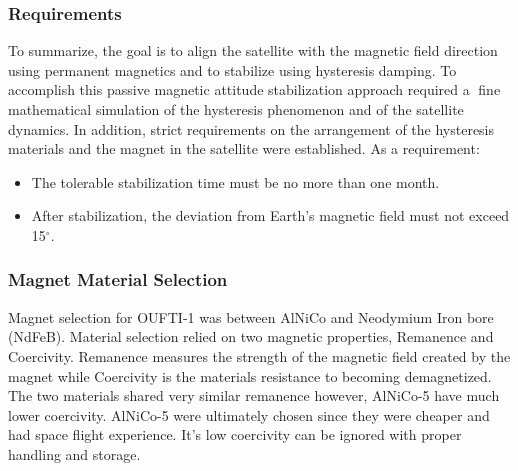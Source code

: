 \documentclass[12pt]{article}
\begin{document}
\subsubsection{Requirements}
To summarize, the goal is to align the satellite with the magnetic field direction using permanent magnetics and to stabilize using hysteresis damping. To accomplish this passive magnetic attitude stabilization approach required a fine mathematical simulation of the hysteresis phenomenon and of the satellite dynamics. In addition, strict requirements on the arrangement of the hysteresis materials and the magnet in the satellite were established. As a requirement:
\begin{itemize}
\item The tolerable stabilization time must be no more than one month.
\item After stabilization, the deviation from Earth's magnetic field must not exceed 15$^{\circ}$.
\end{itemize}
\subsubsection{Magnet Material Selection}
Magnet selection for OUFTI-1 was  between AlNiCo and Neodymium Iron bore (NdFeB). Material selection relied on two magnetic properties, Remanence and Coercivity. Remanence measures the strength of the magnetic field created by the magnet while Coercivity is the materials resistance to becoming demagnetized. The two materials shared very similar remanence however, AlNiCo-5 have much lower coercivity. AlNiCo-5 were ultimately chosen since they were cheaper and had space flight experience. It's low coercivity can be ignored with proper handling and storage.
\end{document}
